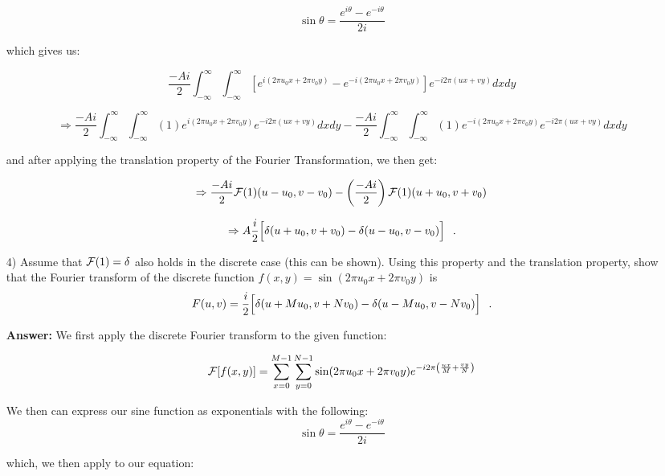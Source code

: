 \documentclass{article}
\begin{document}
\begin{enumerate}
$$\sin\theta = \frac{e^{i\theta} - e^{-i\theta}}{2i}$$

which gives us:

\begin{equation}
\frac{-Ai}{2} \int_{-\infty}^{\infty} \int_{-\infty}^{\infty} \left[ e^{i(2\pi u_0 x + 2\pi v_0 y)} - e^{-i(2\pi u_0 x + 2\pi v_0 y)} \right] e^{-i2\pi (ux + vy)} dx dy
\end{equation}

\footnotesize
\begin{equation}
\Rightarrow \frac{-Ai}{2} \int_{-\infty}^{\infty} \int_{-\infty}^{\infty} (1) e^{i(2\pi u_0 x + 2\pi v_0 y)} e^{-i2\pi (ux + vy)} dx dy - \frac{-Ai}{2} \int_{-\infty}^{\infty} \int_{-\infty}^{\infty} (1) e^{-i(2\pi u_0 x + 2\pi v_0 y)} e^{-i2\pi (ux + vy)} dx dy
\end{equation}
\normalsize

and after applying the translation property of the Fourier Transformation, we then get:

\begin{equation}
\Rightarrow \frac{-Ai}{2} {\cal F} (1) (u - u_0, v - v_0) - \left( \frac{-Ai}{2} \right) {\cal F} (1) (u + u_0, v + v_0)
\end{equation}

\begin{equation}
\Rightarrow A\frac{i}{2}\Big[\delta(u+u_0,v+v_0)-\delta(u-u_0,v-v_0)\Big] \hspace{0.1in}.
\end{equation}

\item[4)] Assume that ${\cal F}(1)=\delta$ also holds in the discrete case (this can be shown). Using this property and the translation property, show that 
the Fourier transform of the discrete function $f(x,y)=\sin(2\pi u_0 x+2\pi v_0y)$ is 
$$F(u,v)=\frac{i}{2}\Big[\delta(u+Mu_0,v+Nv_0)-\delta(u-Mu_0,v-Nv_0)\Big] \hspace{0.1in}.$$

\textbf{Answer: }We first apply the discrete Fourier transform to the given function:

$${\cal F}[f(x,y)] = \sum_{x = 0}^{M-1} \sum_{y = 0}^{N - 1} \sin(2\pi u_0 x+2\pi v_0y) e^{-i2\pi \left( \frac{ux}{M} + \frac{vy}{N} \right)}$$

We then can express our sine function as exponentials with the following:
$$\sin\theta = \frac{e^{i\theta} - e^{-i\theta}}{2i}$$

which, we then apply to our equation:


\end{enumerate}
\end{document}
